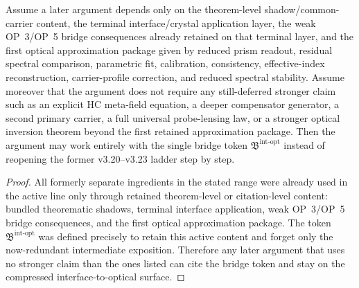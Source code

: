 \begin{proposition}
\label{prop:first-bundled-theorem-level-shadow-package}
\label{prop:first-v320-crystal-shadow-compatibility-principle}
\label{prop:terminal-citation-rule-for-the-present-v320-working-interface}
\label{prop:first-interface-level-defect-face-vanishing-principle}
\label{prop:first-interface-level-fluid-readout-demotion-principle}
\label{prop:first-interface-level-common-carrier-projection-principle}
\label{prop:first-interface-level-probe-coupling-principle}
\label{prop:first-bundled-interface-application-package}
\label{prop:first-op3-op5-bridge-test-on-the-terminal-interface}
\label{prop:first-parametric-spectral-fit-principle}
\label{prop:first-three-parameter-spectral-calibration-principle}
\label{prop:first-overdetermined-spectral-consistency-principle}
\label{prop:first-effective-index-reconstruction-principle-from-prism-data}
\label{prop:first-carrier-profile-correction-principle}
\label{prop:first-reduced-spectral-stability-principle}
\label{prop:first-bundled-optical-approximation-package}
Assume a later argument depends only on the theorem-level shadow/common-carrier content, the terminal interface/crystal application layer, the weak OP~3/OP~5 bridge consequences already retained on that terminal layer, and the first optical approximation package given by reduced prism readout, residual spectral comparison, parametric fit, calibration, consistency, effective-index reconstruction, carrier-profile correction, and reduced spectral stability. Assume moreover that the argument does not require any still-deferred stronger claim such as an explicit HC meta-field equation, a deeper compensator generator, a second primary carrier, a full universal probe-lensing law, or a stronger optical inversion theorem beyond the first retained approximation package. Then the argument may work entirely with the single bridge token $\mathfrak B^{\mathrm{int\text{-}opt}}$ instead of reopening the former v3.20--v3.23 ladder step by step.
\end{proposition}

\begin{proof}
All formerly separate ingredients in the stated range were already used in the active line only through retained theorem-level or citation-level content: bundled theorematic shadows, terminal interface application, weak OP~3/OP~5 bridge consequences, and the first optical approximation package. The token $\mathfrak B^{\mathrm{int\text{-}opt}}$ was defined precisely to retain this active content and forget only the now-redundant intermediate exposition. Therefore any later argument that uses no stronger claim than the ones listed can cite the bridge token and stay on the compressed interface-to-optical surface.
\end{proof}

